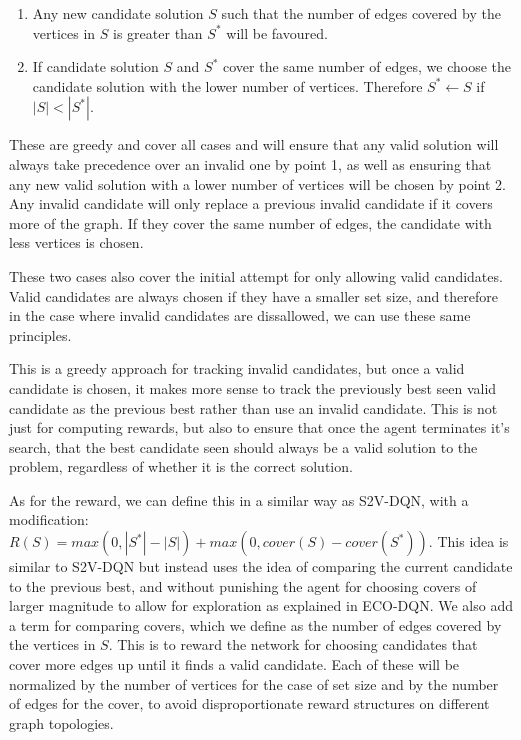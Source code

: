 \documentclass{article}
\begin{document}
\begin{enumerate}
    \item Any new candidate solution $S$ such that the number of edges covered by the vertices in $S$ is greater than $S^*$ will be favoured.
    \item If candidate solution $S$ and $S^*$ cover the same number of edges, we choose the candidate solution with the lower number of vertices. Therefore $S^* \leftarrow S$ if $|S| < |S^*|$. 
\end{enumerate}

These are greedy and cover all cases and will ensure that any valid solution will always take precedence over an invalid one by point 1, as well as ensuring that any new valid solution with a lower number of vertices will be chosen by point 2. Any invalid candidate will only replace a previous invalid candidate if it covers more of the graph. If they cover the same number of edges, the candidate with less vertices is chosen.

These two cases also cover the initial attempt for only allowing valid candidates. Valid candidates are always chosen if they have a smaller set size, and therefore in the case where invalid candidates are dissallowed, we can use these same principles. 

This is a greedy approach for tracking invalid candidates, but once a valid candidate is chosen, it makes more sense to track the previously best seen valid candidate as the previous best rather than use an invalid candidate. This is not just for computing rewards, but also to ensure that once the agent terminates it's search, that the best candidate seen should always be a valid solution to the problem, regardless of whether it is the correct solution.

As for the reward, we can define this in a similar way as S2V-DQN, with a modification: $R(S) = max(0, |S^*| - |S|) + max(0, cover(S) - cover(S^*))$. This idea is similar to S2V-DQN but instead uses the idea of comparing the current candidate to the previous best, and without punishing the agent for choosing covers of larger magnitude to allow for exploration as explained in ECO-DQN. We also add a term for comparing covers, which we define as the number of edges covered by the vertices in $S$. This is to reward the network for choosing candidates that cover more edges up until it finds a valid candidate. Each of these will be normalized by the number of vertices for the case of set size and by the number of edges for the cover, to avoid disproportionate reward structures on different graph topologies. 
\end{document}
